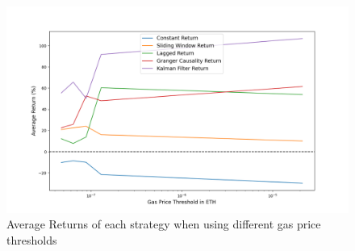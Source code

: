 \begin{figure}[H]
    \centering
    \includegraphics[width=\linewidth]{evaluation/Images/VaryGPThreshold.png}
    \caption{Average Returns of each strategy when using different gas price thresholds}
    \label{fig:VaryGasPriceThresholds}
\end{figure}

